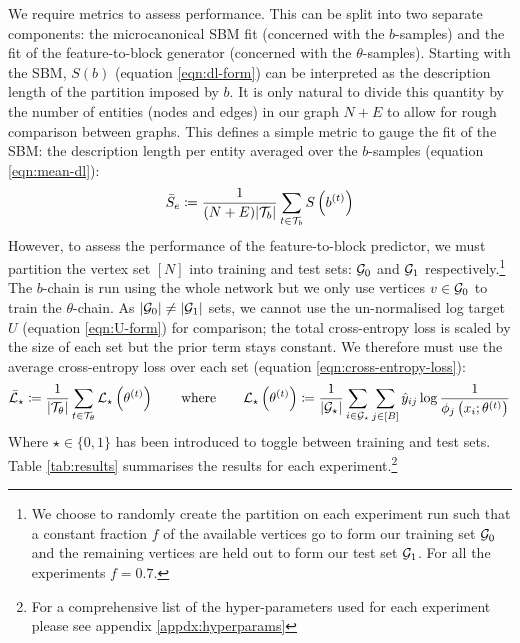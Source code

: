 We require metrics to assess performance. This can be split into two separate components: the microcanonical SBM fit (concerned with the $b$-samples) and the fit of the feature-to-block generator (concerned with the $\theta$-samples). Starting with the SBM, $S(b)$ (equation \ref{eqn:dl-form}) can be interpreted as the description length of the partition imposed by $b$. It is only natural to divide this quantity by the number of entities (nodes and edges) in our graph $N+E$ to allow for rough comparison between graphs. This defines a simple metric to gauge the fit of the SBM: the description length per entity averaged over the $b$-samples (equation \ref{eqn:mean-dl}):
%
\begin{equation}
	\bar{S}_e \coloneqq \frac{1}{(N+E) |\mathcal{T}_b|} \sum_{t\in \mathcal{T}_b} S \left( b^{(t)} \right)
	\label{eqn:mean-dl}
\end{equation}
%
However, to assess the performance of the feature-to-block predictor, we must partition the vertex set $[N]$ into training and test sets: $\mathcal{G}_0$ and $\mathcal{G}_1$ respectively.\footnote{We choose to randomly create the partition on each experiment run such that a constant fraction $f$ of the available vertices go to form our training set $\mathcal{G}_0$ and the remaining vertices are held out to form our test set $\mathcal{G}_1$. For all the experiments $f=0.7$.}
The $b$-chain is run using the whole network but we only use vertices $v \in \mathcal{G}_0$ to train the $\theta$-chain. As $|\mathcal{G}_0| \neq |\mathcal{G}_1|$ sets, we cannot use the un-normalised log target $U$ (equation \ref{eqn:U-form}) for comparison; the total cross-entropy loss is scaled by the size of each set but the prior term stays constant. We therefore must use the average cross-entropy loss over each set (equation \ref{eqn:cross-entropy-loss}):
%
\begin{equation}
	\bar{\mathcal{L}}_\star \coloneqq \frac{1}{|\mathcal{T}_\theta|} \sum_{t \in \mathcal{T}_\theta} \mathcal{L}_\star \left( \theta^{(t)} \right)
	\qquad \textrm{where} \qquad
	\mathcal{L}_\star \left( \theta^{(t)} \right) \coloneqq \frac{1}{|\mathcal{G}_\star|} \sum_{i \in \mathcal{G}_\star}\sum_{j \in [B]} \hat{y}_{ij} \log \frac{1}{\phi_j \left(x_i; \theta^{(t)} \right)}
	\label{eqn:cross-entropy-loss}
\end{equation}
%
Where $\star \in \{0, 1\}$ has been introduced to toggle between training and test sets. Table \ref{tab:results} summarises the results for each experiment.\footnote{For a comprehensive list of the hyper-parameters used for each experiment please see appendix \ref{appdx:hyperparams}}

